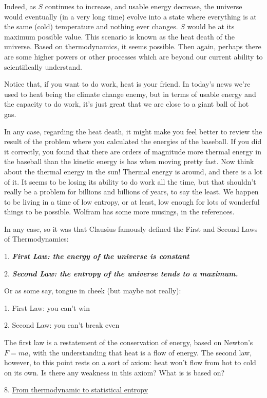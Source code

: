 \documentclass[12pt]{article}
\begin{document}
Indeed, as $S$ continues to increase, and usable energy decrease, the universe would eventually (in a very long time) evolve into a state where everything is at the same (cold) temperature and nothing ever changes. $S$ would be at its maximum possible value. This scenario is known as the heat death of the universe. Based on thermodynamics, it seems possible. Then again, perhaps there are some higher powers or other processes which are beyond our current ability to scientifically understand.

Notice that, if you want to do work, heat is your friend. In today's news we're used to heat being the climate change enemy, but in terms of usable energy and the capacity to do work, it's just great that we are close to a giant ball of hot gas. 

In any case, regarding the heat death, it might make you feel better to review the result of the problem where you calculated the energies of the baseball. If you did it correctly, you found that there are orders of magnitude more thermal energy in the baseball than the kinetic energy is has when moving pretty fast. Now think about the thermal energy in the sun! Thermal energy is around, and there is a lot of it. It seems to be losing its ability to do work all the time, but that shouldn't really be a problem for billions and billions of years, to say the least. We happen to be living in a time of low entropy, or at least, low enough for lots of wonderful things to be possible. Wolfram has some more musings, in the references.

In any case, so it was that Clausius famously defined the First and Second Laws of Thermodynamics:

1. \textit{\textbf{First Law: the energy of the universe is constant}}

2. \textbf{\textit{Second Law: the entropy of the universe tends to a maximum.}}

Or as some say, tongue in cheek (but maybe not really):

1. First Law: you can't win

2. Second Law: you can't break even

The first law is a restatement of the conservation of energy, based on Newton's $F=ma$, with the understanding that heat is a flow of energy. The second law, however, to this point rests on a sort of axiom: heat won't flow from hot to cold on its own. Is there any weakness in this axiom? What is is based on?

8. \underline{From thermodynamic to statistical entropy}
\end{document}
